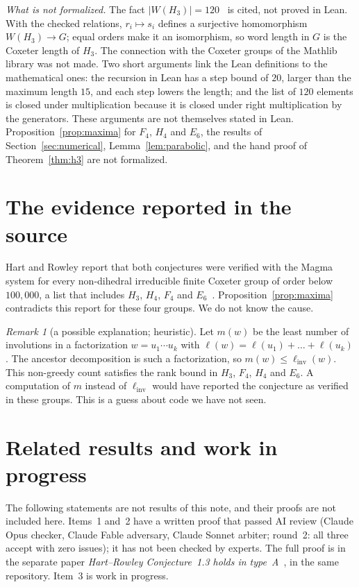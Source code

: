 \documentclass[11pt]{amsart}
\theoremstyle{definition}\newtheorem{definition}[theorem]{Definition}
\theoremstyle{remark}\newtheorem{remark}[theorem]{Remark}
\newcommand{\linv}{\ell_{\mathrm{inv}}}
\begin{document}
\emph{What is not formalized.} The fact \(\lvert W(H_3)\rvert=120\)~\cite[\S2.11]{Hum} is cited, not proved in Lean. With the checked relations, \(r_i\mapsto s_i\) defines a surjective homomorphism \(W(H_3)\to G\); equal orders make it an isomorphism, so word length in \(G\) is the Coxeter length of \(H_3\). The connection with the Coxeter groups of the Mathlib library was not made. Two short arguments link the Lean definitions to the mathematical ones: the recursion in Lean has a step bound of \(20\), larger than the maximum length \(15\), and each step lowers the length; and the list of \(120\) elements is closed under multiplication because it is closed under right multiplication by the generators. These arguments are not themselves stated in Lean. Proposition~\ref{prop:maxima} for \(F_4\), \(H_4\) and \(E_6\), the results of Section~\ref{sec:numerical}, Lemma~\ref{lem:parabolic}, and the hand proof of Theorem~\ref{thm:h3} are not formalized.

\section{The evidence reported in the source}\label{sec:source}

Hart and Rowley report that both conjectures were verified with the Magma system for every non-dihedral irreducible finite Coxeter group of order below \(100{,}000\), a list that includes \(H_3\), \(H_4\), \(F_4\) and \(E_6\)~\cite[\S3]{HR}. Proposition~\ref{prop:maxima} contradicts this report for these four groups. We do not know the cause.

\begin{remark}[a possible explanation; heuristic]\label{rem:heuristic}
Let \(m(w)\) be the least number of involutions in a factorization \(w=u_1\cdots u_k\) with \(\ell(w)=\ell(u_1)+\dots+\ell(u_k)\). The ancestor decomposition is such a factorization, so \(m(w)\le\linv(w)\). This non-greedy count satisfies the rank bound in \(H_3\), \(F_4\), \(H_4\) and \(E_6\). A computation of \(m\) instead of \(\linv\) would have reported the conjecture as verified in these groups. This is a guess about code we have not seen.
\end{remark}

\section{Related results and work in progress}\label{sec:wip}

The following statements are not results of this note, and their proofs are not included here. Items~1 and~2 have a written proof that passed AI review (Claude Opus checker, Claude Fable adversary, Claude Sonnet arbiter; round~2: all three accept with zero issues); it has not been checked by experts. The full proof is in the separate paper \emph{Hart--Rowley Conjecture~1.3 holds in type~A}~\cite{TypeA}, in the same repository. Item~3 is work in progress.
\end{document}
